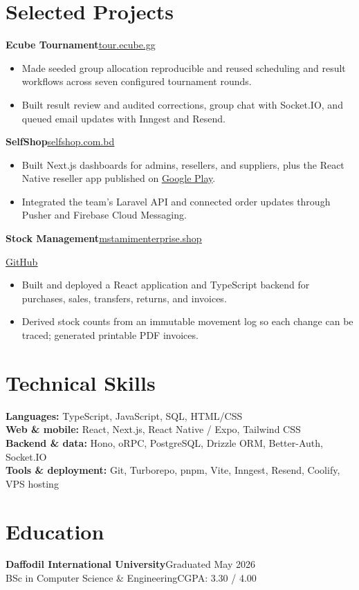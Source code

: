 \documentclass[letterpaper,11pt]{article}
\newcommand{\project}[3]{%
  \noindent\textbf{#1}\enspace\textbar\enspace\href{#2}{\underline{#3}}
}
\newenvironment{details}{%
  \begin{itemize}[leftmargin=0.15in,label=\textbullet,itemsep=2pt,topsep=3pt,parsep=0pt,partopsep=0pt]
  \small
}{\end{itemize}}
\begin{document}
\section{Selected Projects}

\project{Ecube Tournament}{https://tour.ecube.gg/}{tour.ecube.gg}\par
\begin{details}
  \item Made seeded group allocation reproducible and reused scheduling and result workflows across seven configured tournament rounds.
  \item Built result review and audited corrections, group chat with Socket.IO, and queued email updates with Inngest and Resend.
\end{details}
\vspace{3pt}

\project{SelfShop}{https://selfshop.com.bd/}{selfshop.com.bd}\par
\begin{details}
  \item Built Next.js dashboards for admins, resellers, and suppliers, plus the React Native reseller app published on \href{https://play.google.com/store/apps/details?id=com.selfshop.reseller}{\underline{Google Play}}.
  \item Integrated the team's Laravel API and connected order updates through Pusher and Firebase Cloud Messaging.
\end{details}
\vspace{3pt}

\project{Stock Management}{https://mstamimenterprise.shop/}{mstamimenterprise.shop}
\enspace\textbar\enspace\href{https://github.com/Shorno/stock-management}{\underline{GitHub}}\par
\begin{details}
  \item Built and deployed a React application and TypeScript backend for purchases, sales, transfers, returns, and invoices.
  \item Derived stock counts from an immutable movement log so each change can be traced; generated printable PDF invoices.
\end{details}

\section{Technical Skills}
{\small
  \textbf{Languages:} TypeScript, JavaScript, SQL, HTML/CSS\\[3pt]
  \textbf{Web \& mobile:} React, Next.js, React Native / Expo, Tailwind CSS\\[3pt]
  \textbf{Backend \& data:} Hono, oRPC, PostgreSQL, Drizzle ORM, Better-Auth, Socket.IO\\[3pt]
  \textbf{Tools \& deployment:} Git, Turborepo, pnpm, Vite, Inngest, Resend, Coolify, VPS hosting
}\par

\section{Education}
\noindent\textbf{Daffodil International University}\hfill{\small\color{secondary}Graduated May 2026}\\[2pt]
{\small BSc in Computer Science \& Engineering\enspace\textbar\enspace CGPA: 3.30 / 4.00}
\end{document}
